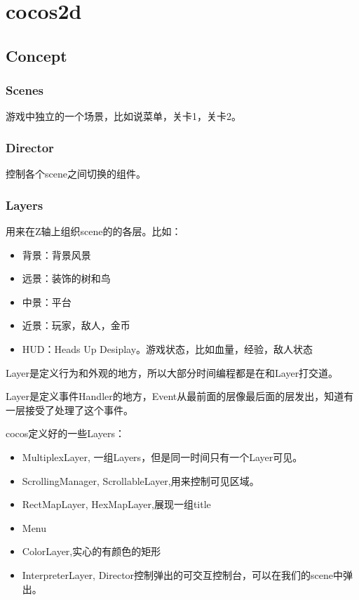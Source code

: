 \chapter{cocos2d}

\section{Concept}

\subsection{Scenes}
游戏中独立的一个场景，比如说菜单，关卡1，关卡2。

\subsection{Director}
控制各个scene之间切换的组件。

\subsection{Layers}
用来在Z轴上组织scene的的各层。比如：
\begin{itemize}
\item 背景：背景风景
\item 远景：装饰的树和鸟
\item 中景：平台
\item 近景：玩家，敌人，金币
\item HUD：Heads Up Desiplay。游戏状态，比如血量，经验，敌人状态
\end{itemize}

Layer是定义行为和外观的地方，所以大部分时间编程都是在和Layer打交道。

Layer是定义事件Handler的地方，Event从最前面的层像最后面的层发出，知道有一层接受了处理了这个事件。

cocos定义好的一些Layers：
\begin{itemize}
\item MultiplexLayer, 一组Layers，但是同一时间只有一个Layer可见。
\item ScrollingManager, ScrollableLayer,用来控制可见区域。
\item RectMapLayer, HexMapLayer,展现一组title
\item Menu
\item ColorLayer,实心的有颜色的矩形
\item InterpreterLayer, Director控制弹出的可交互控制台，可以在我们的scene中弹出。
\end{itemize}

